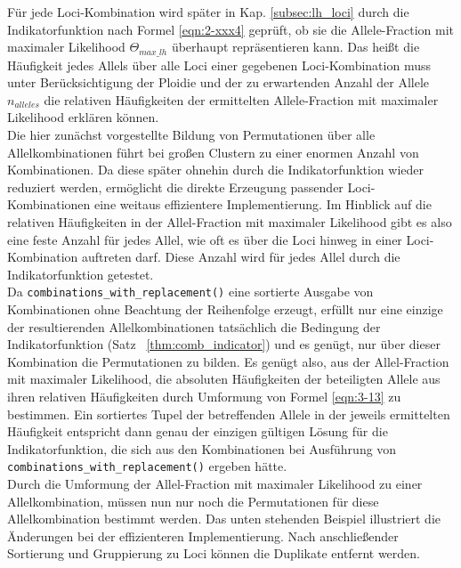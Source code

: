 Für jede Loci-Kombination wird später in Kap. \ref{subsec:lh_loci} durch die Indikatorfunktion nach Formel \eqref{eqn:2-xxx4} geprüft, ob sie die Allele-Fraction mit maximaler Likelihood $\Theta_{max\_lh}$ überhaupt repräsentieren kann. Das heißt die Häufigkeit jedes Allels über alle Loci einer gegebenen Loci-Kombination muss unter Berücksichtigung der Ploidie und der zu erwartenden Anzahl der Allele $n_{alleles}$ die relativen Häufigkeiten der ermittelten Allele-Fraction mit maximaler Likelihood erklären können. \\

Die hier zunächst vorgestellte Bildung von Permutationen über alle Allelkombinationen führt bei großen Clustern zu einer enormen Anzahl von Kombinationen. Da diese später ohnehin durch die Indikatorfunktion wieder reduziert werden, ermöglicht die direkte Erzeugung passender Loci-Kombinationen eine weitaus effizientere Implementierung. Im Hinblick auf die relativen Häufigkeiten in der Allel-Fraction mit maximaler Likelihood gibt es also eine feste Anzahl für jedes Allel, wie oft es über die Loci hinweg in einer Loci-Kombination auftreten darf. Diese Anzahl wird für jedes Allel durch die Indikatorfunktion getestet.\\

Da \lstinline|combinations_with_replacement()| eine sortierte Ausgabe von Kombinationen ohne Beachtung der Reihenfolge erzeugt, erfüllt nur eine einzige der resultierenden Allelkombinationen tatsächlich die Bedingung der Indikatorfunktion (Satz ~\ref{thm:comb_indicator}) und es genügt, nur über dieser Kombination die Permutationen zu bilden. Es genügt also, aus der Allel-Fraction mit maximaler Likelihood, die absoluten Häufigkeiten der beteiligten Allele aus ihren relativen Häufigkeiten durch Umformung von Formel \eqref{eqn:3-13} zu bestimmen. Ein sortiertes Tupel der betreffenden Allele in der jeweils ermittelten Häufigkeit entspricht dann genau der einzigen gültigen Lösung für die Indikatorfunktion, die sich aus den Kombinationen bei Ausführung von \lstinline|combinations_with_replacement()| ergeben hätte.\\

Durch die Umformung der Allel-Fraction mit maximaler Likelihood zu einer Allelkombination, müssen nun nur noch die Permutationen für diese Allelkombination bestimmt werden. Das unten stehenden Beispiel illustriert die Änderungen bei der effizienteren Implementierung. Nach anschließender Sortierung und Gruppierung zu Loci können die Duplikate entfernt werden. \\

